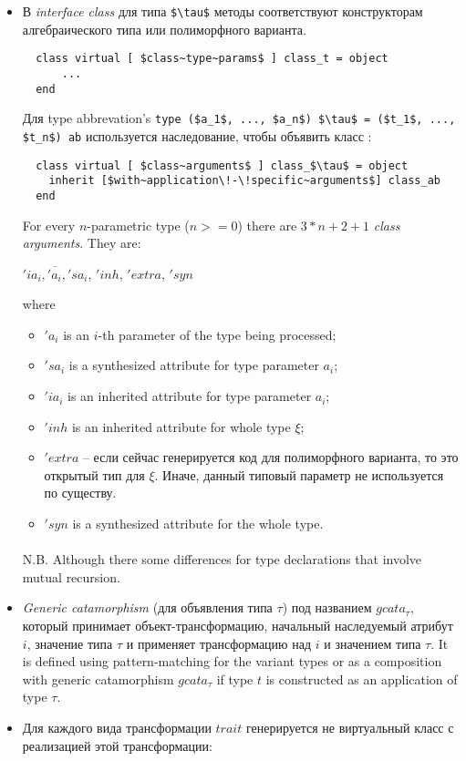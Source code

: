 \documentclass[acmsmall,review,anonymous]{acmart}\settopmatter{printfolios=true,printccs=false,printacmref=false}
\begin{document}
\begin{itemize}
  \item В \textit{interface class} для типа \lstinline{$\tau$} методы соответствуют конструкторам алгебраического типа или полиморфного варианта. 
  \begin{lstlisting}
  class virtual [ $class~type~params$ ] class_t = object
      ...
  end
  \end{lstlisting}
  Для type abbrevation's \lstinline{type ($a_1$, ..., $a_n$) $\tau$ = ($t_1$, ..., $t_n$) ab} 
  используется наследование, чтобы объявить класс : 
  \begin{lstlisting}
  class virtual [ $class~arguments$ ] class_$\tau$ = object
    inherit [$with~application\!-\!specific~arguments$] class_ab
  end
  \end{lstlisting}

  For every $n$-parametric type ($n>=0$) there are $3*n+2+1$ \emph{class arguments}. They are:
    \begin{center}
        $\overline{'ia_i, 'a_i, 'sa_i}$, $'inh$, $'extra$, $'syn$
    \end{center}
  where \begin{itemize}
          \item $'a_i$ is an $i$-th parameter of the type being processed;
          \item $'sa_i$ is a synthesized attribute for type parameter $a_i$;
          \item $'ia_i$ is an inherited attribute for type parameter $a_i$;
          \item $'inh$ is an inherited attribute for whole type $\xi$;
          \item $'extra$ -- если сейчас генерируется код для полиморфного варианта, то это открытый тип для $\xi$. Иначе, данный типовый параметр не используется по существу.
          \item $'syn$ is a synthesized attribute for the whole type.
  \end{itemize}
  
  \paragraph{}
  N.B. Although there some differences for type declarations that involve mutual recursion.
  
  \item \emph{Generic catamorphism} (для объявления типа $\tau$) под названием $gcata_\tau$, который принимает объект-трансформацию, начальный наследуемый атрибут $i$, значение типа $\tau$ и применяет трансформацию над $i$ и значением типа $\tau$. It is defined using pattern-matching for the variant types or as a composition with generic catamorphism $gcata_\tau$ if type $t$ is constructed as an application of type $\tau$.
  \item Для каждого вида трансформации $trait$ генерируется не виртуальный класс с реализацией этой трансформации:


\end{itemize}
\end{document}
